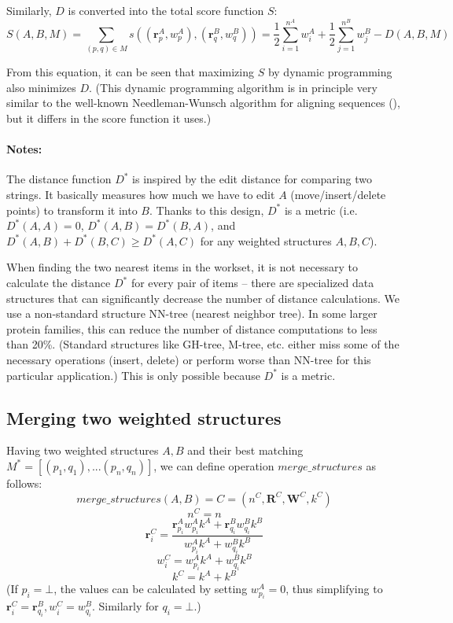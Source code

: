 \documentclass{article}
\begin{document}
Similarly, \(D\) is converted into the total score function \(S\):
  \[
    S(A, B, M) 
    = \sum\limits_{(p, q) \in M}{s \left( (\mathbf{r}^A_{p}, w^A_{p}), (\mathbf{r}^B_{q}, w^B_{q}) \right)}
    = \frac{1}{2} \sum\limits_{i=1}^{n^A}{w^A_i} + \frac{1}{2} \sum\limits_{j=1}^{n^B}{w^B_j} - D(A, B, M)
  \]

From this equation, it can be seen that maximizing \(S\) by dynamic
programming also minimizes \(D\). (This dynamic programming algorithm is in principle
very similar to the well-known Needleman-Wunsch algorithm for aligning sequences 
(), 
but it differs in the score function it uses.)

\paragraph{Notes:} 
The distance function \(D^*\) is inspired by the edit distance for 
comparing two strings. It basically measures how much we have to edit \(A\) 
(move/insert/delete points) to transform it into \(B\). 
Thanks to this design, \(D^*\) is a metric 
(i.e.~\(D^*(A,A) = 0\), \(D^*(A,B) = D^*(B,A)\), and
\(D^*(A,B) + D^*(B,C) \geq D^*(A,C)\) for any weighted structures
\(A, B, C\)).

When finding the two nearest items in the workset, it is not
necessary to calculate the distance \(D^*\) for every pair of items --
there are specialized data structures that can significantly decrease
the number of distance calculations. We use a non-standard structure
NN-tree (nearest neighbor tree). In some larger protein families, this
can reduce the number of distance computations to less than 20\%. 
(Standard structures like GH-tree, M-tree, etc. either miss some of
the necessary operations (insert, delete) or perform worse than NN-tree
for this particular application.) This is only possible because \(D^*\) 
is a metric.



\subsection{Merging two weighted structures}

\label{sec:appendix_ws_merging}

Having two weighted structures \(A, B\) and their best matching
\(M^* = [(p_1, q_1), ... (p_n, q_n)]\), we can define 
operation \(merge\_structures\) as follows:
  \[  merge\_structures(A, B) = C = (n^C, \mathbf{R}^C, \mathbf{W}^C, k^C)  \]
  \[  n^C = n  \]
  \[  \mathbf{r}^C_i = \frac {\mathbf{r}^A_{p_i} w^A_{p_i} k^A + \mathbf{r}^B_{q_i} w^B_{q_i} k^B} {w^A_{p_i} k^A + w^B_{q_i} k^B}  \]
  \[  w^C_i = w^A_{p_i} k^A + w^B_{q_i} k^B  \]
  \[  k^C = k^A + k^B  \]
(If \(p_i=\bot\), the values can be calculated by setting
\(w^A_{p_i} = 0\), thus simplifying to
\(\mathbf{r}^C_i = \mathbf{r}^B_{q_i}, w^C_i = w^B_{q_i}\). Similarly for \(q_i=\bot\).)
\end{document}
